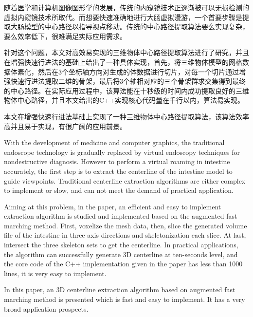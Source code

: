 \begin{cabstract}
随着医学和计算机图像图形学的发展，传统的内窥镜技术正逐渐被可以无损检测的虚拟内窥镜技术所取代。而想要快速准确地进行大肠虚拟漫游，一个首要步骤是提取大肠模型的中心路径以指导视点移动。传统的中心路径提取算法要么实现复杂，要么效率低下，很难满足实际应用需求。

针对这个问题，本文对高效易实现的三维物体中心路径提取算法进行了研究，并且在增强快速行进法的基础上给出了一种具体实现，首先，将三维物体模型的网格数据体素化，然后在3个坐标轴方向对生成的体数据进行切片，对每一个切片通过增强快速行进法提取二维的骨架，最后将3个轴相对应的三个骨架群求交集得到最终的中心路径。在实际应用过程中，该算法能在十秒级的时间内成功提取良好的三维物体中心路径，并且本文给出的C++实现核心代码量在千行以内，算法易实现。

本文在增强快速行进法基础上实现了一种三维物体中心路径提取算法，该算法效率高并且易于实现，有很广阔的应用前景。
\end{cabstract}

\begin{eabstract}
With the development of medicine and computer graphics, the traditional endoscope technology is gradually replaced by virtual endoscopy techniques for nondestructive diagnosis. However to perform a virtual roaming in intestine accurately, the first step is to extract the centerline of the intestine model to guide viewpoints. Traditional centerline extraction algorithms are either complex to implement or slow, and can not meet the demand of practical application.

Aiming at this problem, in the paper, an efficient and easy to implement extraction algorithm is studied and implemented based on the augmented fast marching method. First, voxelize the mesh data, then, slice the generated volume file of the intestine in three axis directions and skeletonization each slice. At last, intersect the three skeleton sets to get the centerline. In practical applications, the algorithm can successfully generate 3D centerline at ten-seconds level, and the core code of the C++ implementation given in the paper has less than 1000 lines, it is very easy to implement.

In this paper, an 3D centerline extraction algorithm based on augmented fast marching method is presented which is fast and easy to implement. It has a very broad application prospects.
\end{eabstract}
